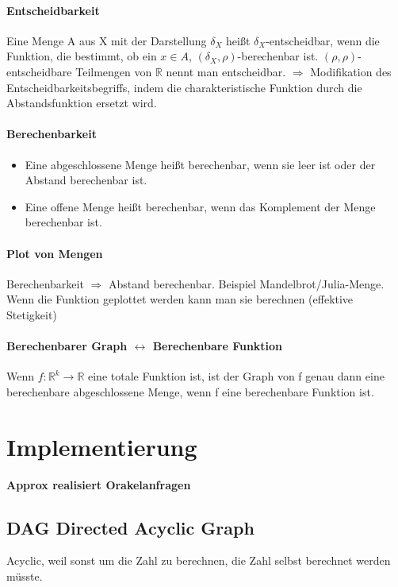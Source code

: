 \documentclass[ngerman]{scrartcl}
\begin{document}
\paragraph{Entscheidbarkeit}
Eine Menge A aus X mit der Darstellung $ \delta_X $ heißt $ \delta_X $-entscheidbar, wenn die Funktion, die bestimmt, ob ein $ x \in A $, $(\delta_X, \rho)$-berechenbar ist. $(\rho, \rho) $-entscheidbare Teilmengen von $\mathbb{R}$ nennt man entscheidbar. $\Rightarrow $ Modifikation des Entscheidbarkeitsbegriffs, indem die charakteristische Funktion durch die Abstandsfunktion ersetzt wird.

\paragraph{Berechenbarkeit}
\begin{itemize}
  \item Eine abgeschlossene Menge heißt berechenbar, wenn sie leer ist oder der Abstand berechenbar ist.
  \item Eine offene Menge heißt berechenbar, wenn das Komplement der Menge berechenbar ist.
\end{itemize}


\paragraph{Plot von Mengen} Berechenbarkeit $ \Rightarrow $ Abstand berechenbar. Beispiel Mandelbrot/Julia-Menge. Wenn die Funktion geplottet werden kann man sie berechnen (effektive Stetigkeit)

\paragraph{Berechenbarer Graph $ \leftrightarrow $ Berechenbare Funktion}
Wenn $ f: \mathbb{R}^k \rightarrow \mathbb{R} $ eine totale Funktion ist, ist der Graph von f genau dann eine berechenbare abgeschlossene Menge, wenn f eine berechenbare Funktion ist.


%
%

\section{Implementierung}
\textbf{Approx realisiert Orakelanfragen}

\subsection{DAG Directed Acyclic Graph}
Acyclic, weil sonst um die Zahl zu berechnen, die Zahl selbst berechnet werden müsste.
\end{document}
